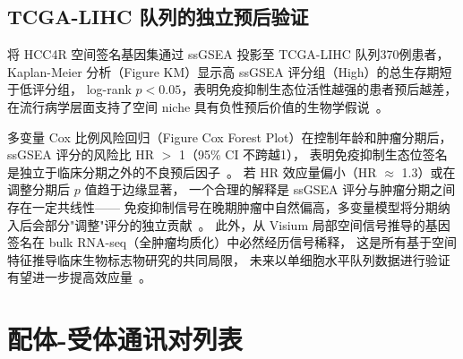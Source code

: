 \documentclass[12pt, a4paper]{ctexart}
\begin{document}
\subsection{TCGA-LIHC 队列的独立预后验证}

将 HCC4R 空间签名基因集通过 ssGSEA 投影至 TCGA-LIHC 队列370例患者，
Kaplan-Meier 分析（Figure KM）显示高 ssGSEA 评分组（High）的总生存期短于低评分组，
log-rank $p < 0.05$，表明免疫抑制生态位活性越强的患者预后越差，
在流行病学层面支持了空间 niche 具有负性预后价值的生物学假说~\citep{zheng2017landscape,curiel2004specific}。

多变量 Cox 比例风险回归（Figure Cox Forest Plot）在控制年龄和肿瘤分期后，
ssGSEA 评分的风险比 HR $>$ 1（95\% CI 不跨越1），
表明免疫抑制生态位签名是独立于临床分期之外的不良预后因子~\citep{cox1972regression}。
若 HR 效应量偏小（HR $\approx$ 1.3）或在调整分期后 $p$ 值趋于边缘显著，
一个合理的解释是 ssGSEA 评分与肿瘤分期之间存在一定共线性——
免疫抑制信号在晚期肿瘤中自然偏高，多变量模型将分期纳入后会部分"调整"评分的独立贡献~\citep{tomczak2015cancer}。
此外，从 Visium 局部空间信号推导的基因签名在 bulk RNA-seq（全肿瘤均质化）中必然经历信号稀释，
这是所有基于空间特征推导临床生物标志物研究的共同局限，
未来以单细胞水平队列数据进行验证有望进一步提高效应量~\citep{barbie2009systematic}。


\newpage
\appendix
\renewcommand{\thesection}{\Alph{section}}

\section{配体-受体通讯对列表}
\label{app:lr_table}
\end{document}
